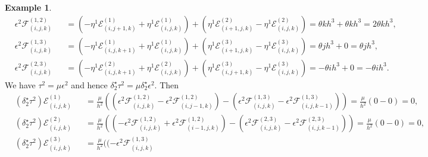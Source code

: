 \documentclass[fleqn]{article}
\theoremstyle{definition}
\newtheorem{example}[theorem]{Example}
\begin{document}
\begin{example}
\begin{subequations}
\begin{alignat}{2}
      & \epsilon^2 \mathcal{F}^{(1, 2)}_{(i, j, k)} &&
        = ( - \eta^1 \mathcal{E}^{(1)}_{(i, j + 1, k)}
            + \eta^1 \mathcal{E}^{(1)}_{(i, j, k)}
          )
        + ( \eta^1 \mathcal{E}^{(2)}_{(i + 1, j, k)}
            - \eta^1 \mathcal{E}^{(2)}_{(i, j, k)}
          )
        = \theta k h^3 + \theta k h^3
        = 2 \theta k h^3, \\
      & \epsilon^2 \mathcal{F}^{(1, 3)}_{(i, j, k)} && 
        = ( - \eta^1 \mathcal{E}^{(1)}_{(i, j, k + 1)}
            + \eta^1 \mathcal{E}^{(1)}_{(i, j, k)}
          )
        + ( \eta^1 \mathcal{E}^{(3)}_{(i + 1, j, k)}
            - \eta^1 \mathcal{E}^{(3)}_{(i, j, k)}
          )
        = \theta j h^3 + 0 = \theta j h^3, \\
      & \epsilon^2 \mathcal{F}^{(2, 3)}_{(i, j, k)} && 
        = ( - \eta^1 \mathcal{E}^{(2)}_{(i, j, k + 1)}
            + \eta^1 \mathcal{E}^{(2)}_{(i, j, k)}
          )
        + ( \eta^1 \mathcal{E}^{(3)}_{(i, j + 1, k)}
            - \eta^1 \mathcal{E}^{(3)}_{(i, j, k)}
          )
        = - \theta i h^3 + 0
        = - \theta i h^3.
    \end{alignat}
  \end{subequations}
  We have $\tau^2 = \mu \epsilon^2$ and hence
  $\delta_2^\star \tau^2 = \mu \delta_2^\star \epsilon^2$.
  Then 
  \begin{subequations}
    \begin{alignat}{2}
      & (\delta_2^\star \tau^2) \mathcal{E}^{(1)}_{(i, j, k)} &&
        =
          \frac{\mu}{h^2}
          (
            ( \epsilon^2 \mathcal{F}^{(1, 2)}_{(i, j, k)}
              - \epsilon^2 \mathcal{F}^{(1, 2)}_{(i, j - 1, k)}
            )
            -
            ( \epsilon^2 \mathcal{F}^{(1, 3)}_{(i, j, k)}
              - \epsilon^2 \mathcal{F}^{(1, 3)}_{(i, j, k - 1)}
            )
          )
        = \frac{\mu}{h^2} (0  - 0)
        = 0, \\
      & (\delta_2^\star \tau^2) \mathcal{E}^{(2)}_{(i, j, k)} &&
        =
          \frac{\mu}{h^2}
          (
            ( - \epsilon^2 \mathcal{F}^{(1, 2)}_{(i, j, k)}
              + \epsilon^2 \mathcal{F}^{(1, 2)}_{(i - 1, j, k)}
            )
            -
            ( \epsilon^2 \mathcal{F}^{(2, 3)}_{(i, j, k)}
              - \epsilon^2 \mathcal{F}^{(2, 3)}_{(i, j, k - 1)}
            )
          )
        = \frac{\mu}{h^2} (0  - 0)
        = 0, \\
      & (\delta_2^\star \tau^2) \mathcal{E}^{(3)}_{(i, j, k)} &&
        =
          \frac{\mu}{h^2}
          (
            ( - \epsilon^2 \mathcal{F}^{(1, 3)}_{(i, j, k)}

\end{alignat}
\end{subequations}
\end{example}
\end{document}
